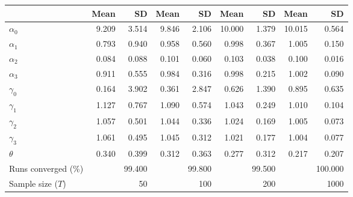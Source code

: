
\begin{tabular}[t]{lrrrrrrrr}
\toprule
  & Mean & SD & Mean  & SD  & Mean   & SD   & Mean    & SD   \\
\midrule
$\alpha_{0}$ & 9.209 & 3.514 & 9.846 & 2.106 & 10.000 & 1.379 & 10.015 & 0.564\\
$\alpha_{1}$ & 0.793 & 0.940 & 0.958 & 0.560 & 0.998 & 0.367 & 1.005 & 0.150\\
$\alpha_{2}$ & 0.084 & 0.088 & 0.101 & 0.060 & 0.103 & 0.038 & 0.100 & 0.016\\
$\alpha_{3}$ & 0.911 & 0.555 & 0.984 & 0.316 & 0.998 & 0.215 & 1.002 & 0.090\\
$\gamma_{0}$ & 0.164 & 3.902 & 0.361 & 2.847 & 0.626 & 1.390 & 0.895 & 0.635\\
$\gamma_{1}$ & 1.127 & 0.767 & 1.090 & 0.574 & 1.043 & 0.249 & 1.010 & 0.104\\
$\gamma_{2}$ & 1.057 & 0.501 & 1.044 & 0.336 & 1.024 & 0.169 & 1.005 & 0.073\\
$\gamma_{3}$ & 1.061 & 0.495 & 1.045 & 0.312 & 1.021 & 0.177 & 1.004 & 0.077\\
$\theta$ & 0.340 & 0.399 & 0.312 & 0.363 & 0.277 & 0.312 & 0.217 & 0.207\\
Runs converged (\%) &  & 99.400 &  & 99.800 &  & 99.500 &  & 100.000\\
Sample size ($T$) &  & 50 &  & 100 &  & 200 &  & 1000\\
\bottomrule
\end{tabular}
